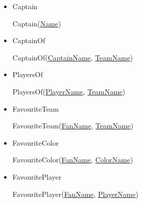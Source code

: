 \documentclass[12pt]{article}
\begin{document}
\begin{enumerate}[1.]
\begin{enumerate}[a)]
\begin{itemize}
            \bigskip

            \item Captain

            \bigskip

            \quad Captain(\underline{Name})

            \bigskip

            \item CaptainOf

            \bigskip

            \quad CaptainOf(\underline{CaptainName}, \underline{TeamName})

            \bigskip

            \item PlayersOf

            \bigskip

            \quad PlayersOf(\underline{PlayerName}, \underline{TeamName})

            \bigskip

            \item FavouriteTeam

            \bigskip

            \quad FavouriteTeam(\underline{FanName}, \underline{TeamName})

            \bigskip

            \item FavouriteColor

            \bigskip

            \quad FavouriteColor(\underline{FanName}, \underline{ColorName})

            \bigskip

            \item FavouritePlayer

            \bigskip

            \quad FavouritePlayer(\underline{FanName}, \underline{PlayerName})

            \bigskip
        \end{itemize}
    \end{enumerate}


\end{enumerate}
\end{document}
